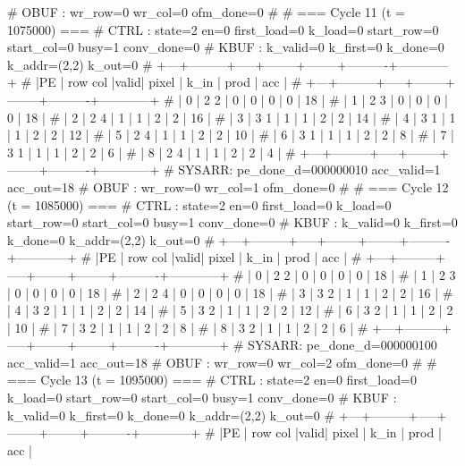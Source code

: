 # OBUF : wr_row=0 wr_col=0 ofm_done=0
# 
# === Cycle 11  (t = 1075000) ===
# CTRL : state=2 en=0 first_load=0 k_load=0 start_row=0 start_col=0 busy=1 conv_done=0
# KBUF : k_valid=0 k_first=0 k_done=0 k_addr=(2,2) k_out=0
# +---+---------+-----+--------+--------+----------+------------+
# |PE | row col |valid| pixel  |  k_in  |   prod   |    acc     |
# +---+---------+-----+--------+--------+----------+------------+
# | 0 |   2   2 |  0  |      0 |      0 |        0 |         18 |
# | 1 |   2   3 |  0  |      0 |      0 |        0 |         18 |
# | 2 |   2   4 |  1  |      1 |      2 |        2 |         16 |
# | 3 |   3   1 |  1  |      1 |      2 |        2 |         14 |
# | 4 |   3   1 |  1  |      1 |      2 |        2 |         12 |
# | 5 |   2   4 |  1  |      1 |      2 |        2 |         10 |
# | 6 |   3   1 |  1  |      1 |      2 |        2 |          8 |
# | 7 |   3   1 |  1  |      1 |      2 |        2 |          6 |
# | 8 |   2   4 |  1  |      1 |      2 |        2 |          4 |
# +---+---------+-----+--------+--------+----------+------------+
# SYSARR: pe_done_d=000000010 acc_valid=1 acc_out=18
# OBUF : wr_row=0 wr_col=1 ofm_done=0
# 
# === Cycle 12  (t = 1085000) ===
# CTRL : state=2 en=0 first_load=0 k_load=0 start_row=0 start_col=0 busy=1 conv_done=0
# KBUF : k_valid=0 k_first=0 k_done=0 k_addr=(2,2) k_out=0
# +---+---------+-----+--------+--------+----------+------------+
# |PE | row col |valid| pixel  |  k_in  |   prod   |    acc     |
# +---+---------+-----+--------+--------+----------+------------+
# | 0 |   2   2 |  0  |      0 |      0 |        0 |         18 |
# | 1 |   2   3 |  0  |      0 |      0 |        0 |         18 |
# | 2 |   2   4 |  0  |      0 |      0 |        0 |         18 |
# | 3 |   3   2 |  1  |      1 |      2 |        2 |         16 |
# | 4 |   3   2 |  1  |      1 |      2 |        2 |         14 |
# | 5 |   3   2 |  1  |      1 |      2 |        2 |         12 |
# | 6 |   3   2 |  1  |      1 |      2 |        2 |         10 |
# | 7 |   3   2 |  1  |      1 |      2 |        2 |          8 |
# | 8 |   3   2 |  1  |      1 |      2 |        2 |          6 |
# +---+---------+-----+--------+--------+----------+------------+
# SYSARR: pe_done_d=000000100 acc_valid=1 acc_out=18
# OBUF : wr_row=0 wr_col=2 ofm_done=0
# 
# === Cycle 13  (t = 1095000) ===
# CTRL : state=2 en=0 first_load=0 k_load=0 start_row=0 start_col=0 busy=1 conv_done=0
# KBUF : k_valid=0 k_first=0 k_done=0 k_addr=(2,2) k_out=0
# +---+---------+-----+--------+--------+----------+------------+
# |PE | row col |valid| pixel  |  k_in  |   prod   |    acc     |

